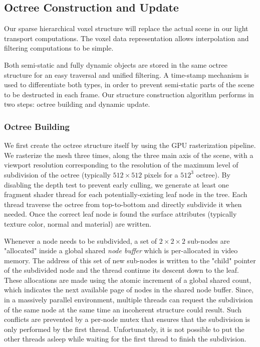 \subsection{Octree Construction and Update}
Our sparse hierarchical voxel structure will replace the actual scene in our light transport computations. The voxel data representation allows interpolation and filtering computations to be simple.

Both semi-static and fully dynamic objects are stored in the same octree structure for an easy traversal and unified filtering. A time-stamp mechanism is used to differentiate both types, in order to prevent semi-static parts of the scene to be destructed in each frame. Our structure construction algorithm performs in two steps: octree building and dynamic update.



\subsubsection{Octree Building}
We first create the octree structure itself by using the GPU rasterization pipeline. We rasterize the mesh three times, along the three main axis of the scene, with a viewport resolution corresponding to the resolution of the maximum level of subdivision of the  octree (typically $512\times 512$ pixels for a $512^{3}$ octree). By disabling the depth test to prevent early culling, we generate at least one fragment shader thread for each potentially-existing leaf node in the tree. Each thread traverse the octree from top-to-bottom and directly subdivide it when needed. Once the correct leaf node is found the surface attributes (typically texture color, normal and material) are written. 

Whenever a node needs to be subdivided, a set of $2\times 2\times 2$ sub-nodes are "allocated" inside a global shared \textit{node buffer} which is per-allocated in video memory. The address of this set of new sub-nodes is written to the "child" pointer of the subdivided node and the thread continue its descent down to the leaf. These allocations are made using the atomic increment of a global shared count, which indicates the next available page of nodes in the shared node buffer. Since, in a massively parallel environment, multiple threads can request the subdivision of the same node at the same time an incoherent structure could result. Such conflicts are prevented by a per-node mutex that ensures that the subdivision is only performed by the first thread. Unfortunately, it is not possible to put the other threads asleep while waiting for the first thread to finish the subdivision.

